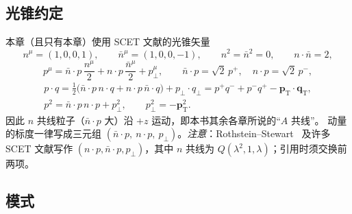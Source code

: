 \subsection{光锥约定}\label{sec:scet-conv}
本章（且只有本章）使用 SCET 文献的光锥矢量
\begin{equation}\label{eq:scet-nnbar}
n^\mu=(1,0,0,1),\qquad \bar n^\mu=(1,0,0,-1),\qquad n^2=\bar n^2=0,\qquad n\cdot\bar n=2,
\end{equation}
\begin{equation}\label{eq:scet-decomp}
p^\mu=\bar n\cdot p\,\frac{n^\mu}{2}+n\cdot p\,\frac{\bar n^\mu}{2}+p_\perp^\mu,\qquad
\bar n\cdot p=\sqrt2\,p^+,\quad n\cdot p=\sqrt2\,p^-,
\end{equation}
\begin{equation}\label{eq:scet-dot}
\begin{gathered}
p\cdot q=\tfrac12\big(\bar n\cdot p\,n\cdot q+n\cdot p\,\bar n\cdot q\big)+p_\perp\cdot q_\perp
=p^+q^-+p^-q^+-\bm p_{\mathrm T}\cdot\bm q_{\mathrm T},\\
p^2=\bar n\cdot p\,n\cdot p+p_\perp^2,\qquad p_\perp^2=-\bm p_{\mathrm T}^2 .
\end{gathered}
\end{equation}
因此 $n$ 共线粒子（$\bar n\cdot p$ 大）沿 $+z$ 运动，即本书其余各章所说的“$A$ 共线”。
动量的标度一律写成三元组 $(\bar n\cdot p,\ n\cdot p,\ p_\perp)$。\emph{注意}：Rothstein--Stewart~\cite{RothsteinStewart2016}
及许多 SCET 文献写作 $(n\cdot p,\bar n\cdot p,p_\perp)$，其中 $n$ 共线为 $Q(\lambda^2,1,\lambda)$；引用时须交换前两项。

\subsection{模式}


